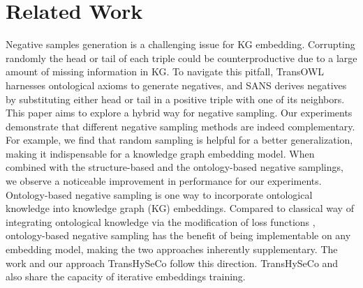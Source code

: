 \documentclass[sigconf]{acmart}
\newcommand{\TransHI}{TransHySeCo\xspace}
\begin{document}
\section{Related Work}
\label{sect:relatedwork}
\vspace*{-0.2cm}
Negative samples generation is a challenging issue for KG embedding. Corrupting randomly the head or tail of each triple \cite{transH,transR} could be counterproductive due to a large amount of missing information in KG. 
To navigate this pitfall, %
TransOWL \cite{transrowl}  harnesses ontological axioms to generate negatives, and SANS \cite{sanspaper} derives negatives by substituting either head or tail in a positive triple  with one of its neighbors. %
This paper aims  to explore a hybrid way for negative sampling. Our experiments demonstrate that different negative sampling methods are indeed complementary. For example, we find that random sampling is helpful for a better generalization, making it  indispensable for a knowledge graph embedding model. When combined  with the structure-based and the ontology-based negative samplings, we observe  a noticeable improvement in performance for our experiments. 
Ontology-based negative sampling is one way to incorporate ontological knowledge into knowledge graph (KG) embeddings. Compared to classical way of integrating ontological knowledge via the modification of loss functions \cite{NEURIPS2019_ontoEmbedding,transrowl}, ontology-based negative sampling has the benefit of being implementable on any embedding model, making the two approaches inherently supplementary. The work \cite{paperiterative} and our approach \TransHI follow this direction. \TransHI and \cite{paperiterative}  also share the capacity of iterative embeddings training. %
\end{document}
